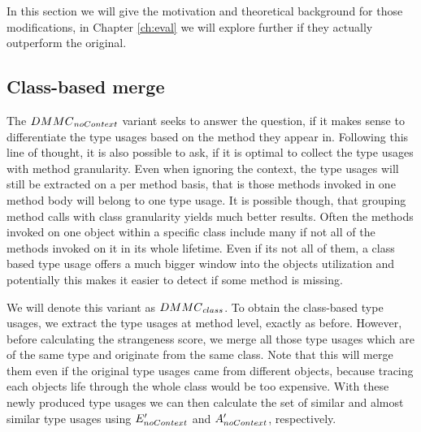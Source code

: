 In this section we will give the motivation and theoretical background for those modifications, in Chapter \ref{ch:eval} we will explore further if they actually outperform the original.

\subsection{Class-based merge}


The $\mathnormal{DMMC}_{\mathnormal{noContext}}$ variant seeks to answer the question, if it makes sense to differentiate the type usages based on the method they appear in.
Following this line of thought, it is also possible to ask, if it is optimal to collect the type usages with method granularity.
Even when ignoring the context, the type usages will still be extracted on a per method basis, that is those methods invoked in one method body will belong to one type usage.
It is possible though, that grouping method calls with class granularity yields much better results.
Often the methods invoked on one object within a specific class include many if not all of the methods invoked on it in its whole lifetime.
Even if its not all of them, a class based type usage offers a much bigger window into the objects utilization and potentially this makes it easier to detect if some method is missing.

We will denote this variant as $\mathnormal{DMMC}_{\mathnormal{class}}$.
To obtain the class-based type usages, we extract the type usages at method level, exactly as before.
However, before calculating the strangeness score, we merge all those type usages which are of the same type and originate from the same class.
Note that this will merge them even if the original type usages came from different objects, because tracing each objects life through the whole class would be too expensive.
With these newly produced type usages we can then calculate the set of similar and almost similar type usages using $E'_{\mathnormal{noContext}}$ and $A'_{\mathnormal{noContext}}$, respectively.

